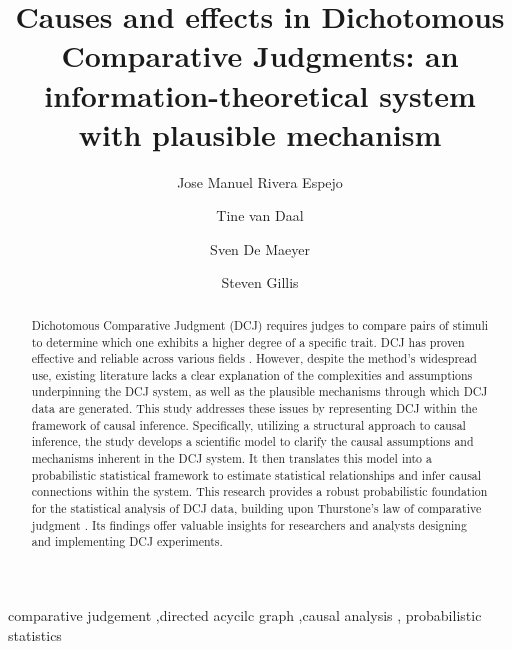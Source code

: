 \documentclass[
  authoryear,
  preprint,
  1p]{elsarticle}
\begin{document}
\begin{frontmatter}
\title{Causes and effects in Dichotomous Comparative Judgments: an
information-theoretical system with plausible mechanism}
\author[1]{Jose Manuel Rivera Espejo%
%
}
\author[1]{Tine van Daal%
%
}
\author[1]{Sven De Maeyer%
%
}
\author[2]{Steven Gillis%
%
}






        
\begin{abstract}
Dichotomous Comparative Judgment (DCJ) requires judges to compare pairs
of stimuli to determine which one exhibits a higher degree of a specific
trait. DCJ has proven effective and reliable across various fields
\citep{Pollitt_2012b, Jones_2015, vanDaal_et_al_2016, Bartholomew_et_al_2018, Lesterhuis_2018, Bartholomew_et_al_2020, Marshall_et_al_2020, Boonen_et_al_2020}.
However, despite the method's widespread use, existing literature lacks
a clear explanation of the complexities and assumptions underpinning the
DCJ system, as well as the plausible mechanisms through which DCJ data
are generated. This study addresses these issues by representing DCJ
within the framework of causal inference. Specifically, utilizing a
structural approach to causal inference, the study develops a scientific
model to clarify the causal assumptions and mechanisms inherent in the
DCJ system. It then translates this model into a probabilistic
statistical framework to estimate statistical relationships and infer
causal connections within the system. This research provides a robust
probabilistic foundation for the statistical analysis of DCJ data,
building upon Thurstone's law of comparative judgment
\citeyearpar{Thurstone_1927}. Its findings offer valuable insights for
researchers and analysts designing and implementing DCJ experiments.
\end{abstract}





\begin{keyword}
    comparative judgement \sep directed acycilc graph \sep causal
analysis \sep 
    probabilistic statistics
\end{keyword}
\end{frontmatter}
    
\end{document}
